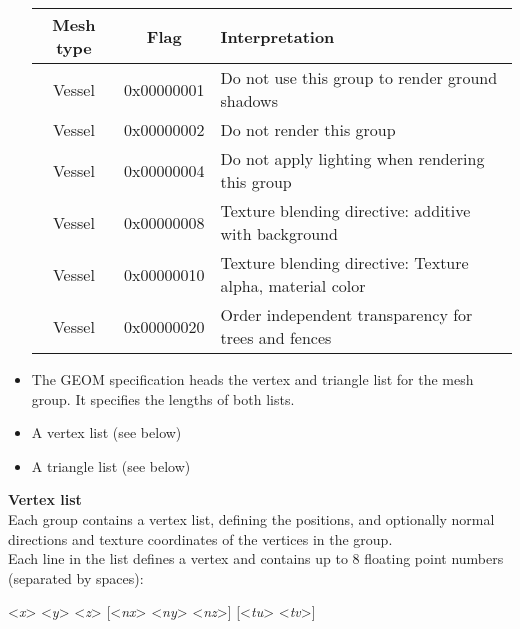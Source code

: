 \documentclass[Orbiter Developer Manual.tex]{subfiles}
\begin{document}
\begin{itemize}
\begin{table}[H]
	\centering
	\begin{tabular}{ |c|c|l| }
	\hline\rule{0pt}{2ex}
	\textbf{Mesh type} & \textbf{Flag} & \textbf{Interpretation} \\
	\hline\rule{0pt}{2ex}
	Vessel & 0x00000001 & Do not use this group to render ground shadows\\
	\hline\rule{0pt}{2ex}
	Vessel & 0x00000002 & Do not render this group\\
	\hline\rule{0pt}{2ex}
	Vessel & 0x00000004 & Do not apply lighting when rendering this group\\
	\hline\rule{0pt}{2ex}
	Vessel & 0x00000008 & Texture blending directive: additive with background\\
	\hline\rule{0pt}{2ex}
	Vessel & 0x00000010 & Texture blending directive: Texture alpha, material color\\
	\hline\rule{0pt}{2ex}
	Vessel & 0x00000020 & Order independent transparency for trees and fences\\
	\hline
	\end{tabular}
\end{table}

\item The GEOM specification heads the vertex and triangle list for the mesh group. It specifies the lengths of both lists.
\item A vertex list (see below)
\item A triangle list (see below)
\end{itemize}

\noindent
\textbf{Vertex list}\\
Each group contains a vertex list, defining the positions, and optionally normal directions and texture coordinates of the vertices in the group.\\
Each line in the list defines a vertex and contains up to 8 floating point numbers (separated by spaces):

\indent <\textit{x}> <\textit{y}> <\textit{z}> [<\textit{nx}> <\textit{ny}> <\textit{nz}>] [<\textit{tu}> <\textit{tv}>]
\end{document}
